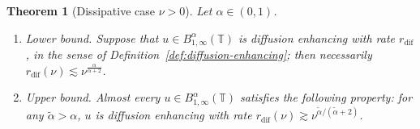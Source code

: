 \documentclass[11pt,oneside,reqno]{amsart}
\newenvironment{enumeratealpha}{\begin{enumerate}[a{\textup{)}}] }{\end{enumerate}}
\newtheorem{theorem}{Theorem}[section]
\numberwithin{equation}{section}
\begin{document}
\begin{theorem}[Dissipative case $\nu > 0$]
  \label{thm:main-thm-enhanced}Let $\alpha \in (0, 1)$.
  \begin{enumeratealpha}
    \item Lower bound. Suppose that $u \in B^{\alpha}_{1, \infty}
    (\mathbb{T})$ is diffusion enhancing with rate
    $r_{\text{dif}}$, in the sense of
    Definition~\ref{def:diffusion-enhancing}; then necessarily
    $r_{\text{dif}} (\nu) \lesssim \nu^{\frac{\alpha}{\alpha +
    2}}$.
    
    \item Upper bound. Almost every $u \in B^{\alpha}_{1, \infty}
    (\mathbb{T})$ satisfies the following property: for any $\tilde{\alpha} >
    \alpha$, $u$ is diffusion enhancing with rate
    $r_{\text{dif}} (\nu) \gtrsim \nu^{\tilde{\alpha} /
    (\tilde{\alpha} + 2)}$.
  \end{enumeratealpha}
\end{theorem}
\end{document}
